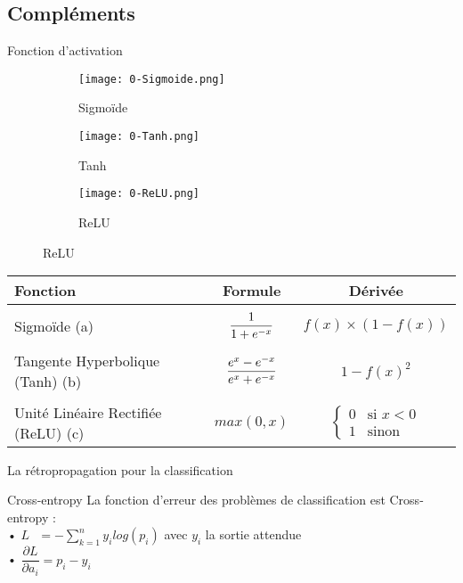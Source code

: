 \subsection{Compléments}

\begin{frame}{Fonction d'activation}
	\begin{figure}
		\begin{subfigure}[]{0.3\textwidth}
			\texttt{[image: 0-Sigmoide.png]}
			\caption{Sigmoïde}
		\end{subfigure}
		\begin{subfigure}[]{0.3\textwidth}
			\texttt{[image: 0-Tanh.png]}
			\caption{Tanh}
		\end{subfigure}
		\begin{subfigure}[]{0.3\textwidth}
			\texttt{[image: 0-ReLU.png]}
			\caption{ReLU}
		\end{subfigure}
	\end{figure}
	\begin{block}{}
		\centering
		\begin{tabular}{ l || c | c | }
			Fonction                            & Formule                                          & Dérivée                                    \\ \hline \\
			Sigmoïde (a)                        & $\mathlarger{\frac{1}{1+e^{-x}}}$                & $f(x) \times (1-f(x))$                     \\ \\
			Tangente Hyperbolique (Tanh) (b)    & $\mathlarger{\frac{e^{x}-e^{-x}}{e^{x}+e^{-x}}}$ & $1-f(x)^2$                                 \\ \\
			Unité Linéaire Rectifiée (ReLU) (c) & $max(0, x)$                                      & $ \left\{\begin{array}{ll}
					0 & \mbox{si } x<0 \\
					1 & \mbox{sinon }\end{array}\right.$ \\
		\end{tabular}
	\end{block}
\end{frame}


\begin{frame}{La rétropropagation pour la classification}
	\begin{block}{Cross-entropy}
		La fonction d'erreur des problèmes de classification est Cross-entropy : \\
		• $L\ \ \ = -\sum_{k=1}^{n}y_ilog(p_i)$ avec $y_i$ la sortie attendue \\
		• $\dfrac{\partial L}{\partial a_i} = p_i - y_i$
	\end{block}
\end{frame}



